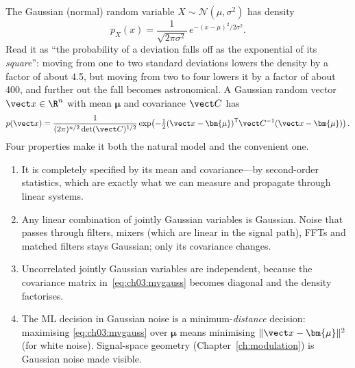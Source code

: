The Gaussian (normal) random variable $X\sim\mathcal N(\mu,\sigma^2)$ has density
\begin{equation}
p_X(x)=\frac{1}{\sqrt{2\pi\sigma^2}}\,e^{-(x-\mu)^2/2\sigma^2}.
\label{eq:ch03:gauss}
\end{equation}
Read it as ``the probability of a deviation falls off as the exponential of its \emph{square}'':
moving from one to two standard deviations lowers the density by a factor of about 4.5, but
moving from two to four lowers it by a factor of about 400, and further out the fall becomes
astronomical. A Gaussian random vector $\vect x\in\R^n$ with mean $\bm{\mu}$ and
covariance $\vect C$ has
\begin{equation}
p(\vect x)=\frac{1}{(2\pi)^{n/2}\det(\vect C)^{1/2}}\exp\!\left(-\tfrac12(\vect x-\bm{\mu})^{\mathsf T}\vect C^{-1}(\vect x-\bm{\mu})\right).
\label{eq:ch03:mvgauss}
\end{equation}
Four properties make it both the natural model and the convenient one.
\begin{enumerate}
\item It is completely specified by its mean and covariance---by second-order statistics, which are
exactly what we can measure and propagate through linear systems.
\item Any linear combination of jointly Gaussian variables is Gaussian. Noise that passes through
filters, mixers (which are linear in the signal path), FFTs and matched filters stays Gaussian;
only its covariance changes.
\item Uncorrelated jointly Gaussian variables are independent, because the covariance matrix
in~\eqref{eq:ch03:mvgauss} becomes diagonal and the density factorises.
\item The ML decision in Gaussian noise is a minimum-\emph{distance} decision: maximising
\eqref{eq:ch03:mvgauss} over $\bm{\mu}$ means minimising $\|\vect x-\bm{\mu}\|^2$ (for white
noise). Signal-space geometry (Chapter~\ref{ch:modulation}) is Gaussian noise made visible.
\end{enumerate}


